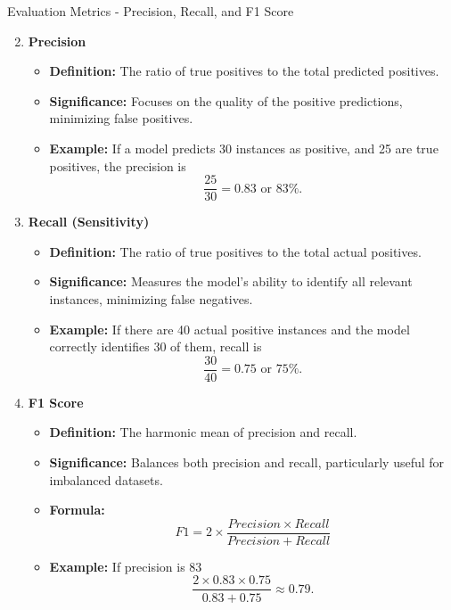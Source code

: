\documentclass[aspectratio=169]{beamer}
\begin{document}
\begin{frame}[fragile]{Evaluation Metrics - Precision, Recall, and F1 Score}
    \begin{enumerate}
        \setcounter{enumi}{1}
        \item \textbf{Precision}
        \begin{itemize}
            \item \textbf{Definition:} The ratio of true positives to the total predicted positives.
            \item \textbf{Significance:} Focuses on the quality of the positive predictions, minimizing false positives.
            \item \textbf{Example:} If a model predicts 30 instances as positive, and 25 are true positives, the precision is 
            \[
            \frac{25}{30} = 0.83 \text{ or } 83\%.
            \]
        \end{itemize}

        \item \textbf{Recall (Sensitivity)}
        \begin{itemize}
            \item \textbf{Definition:} The ratio of true positives to the total actual positives.
            \item \textbf{Significance:} Measures the model's ability to identify all relevant instances, minimizing false negatives.
            \item \textbf{Example:} If there are 40 actual positive instances and the model correctly identifies 30 of them, recall is 
            \[
            \frac{30}{40} = 0.75 \text{ or } 75\%.
            \]
        \end{itemize}

        \item \textbf{F1 Score}
        \begin{itemize}
            \item \textbf{Definition:} The harmonic mean of precision and recall.
            \item \textbf{Significance:} Balances both precision and recall, particularly useful for imbalanced datasets.
            \item \textbf{Formula:} 
            \[
            F1 = 2 \times \frac{Precision \times Recall}{Precision + Recall}
            \]
            \item \textbf{Example:} If precision is 83%
            \[
            \frac{2 \times 0.83 \times 0.75}{0.83 + 0.75} \approx 0.79.
            \]
        \end{itemize}
    \end{enumerate}
\end{frame}
\end{document}
